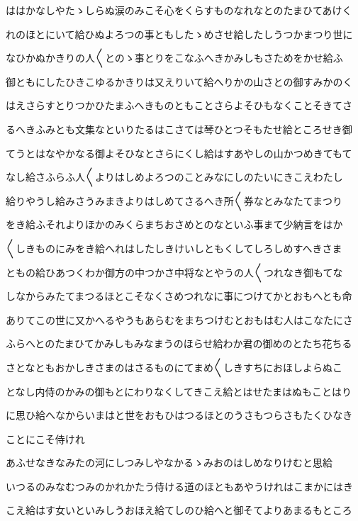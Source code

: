 \documentclass[a4paper,11pt,landscape]{ltjtarticle}
\begin{document}
\par\medskip
ははかなしやたゝしらぬ涙のみこそ心をくらすものなれなとのたまひてあけく
\par\medskip
れのほとにいて給ひぬよろつの事ともしたゝめさせ給したしうつかまつり世に
\par\medskip
なひかぬかきりの人〱とのゝ事とりをこなふへきかみしもさためをかせ給ふ
\par\medskip
御ともにしたひきこゆるかきりは又えりいて給へりかの山さとの御すみかのく
\par\medskip
はえさらすとりつかひたまふへきものともことさらよそひもなくことそきてさ
\par\medskip
るへきふみとも文集なといりたるはこさては琴ひとつそもたせ給ところせき御
\par\medskip
てうとはなやかなる御よそひなとさらにくし給はすあやしの山かつめきてもて
\par\medskip
なし給さふらふ人〱よりはしめよろつのことみなにしのたいにきこえわたし
\par\medskip
給りやうし給みさうみまきよりはしめてさるへき所〱券なとみなたてまつり
\par\medskip
をき給ふそれよりほかのみくらまちおさめとのなといふ事まて少納言をはか
\par\medskip
〱しきものにみをき給へれはしたしきけいしともくしてしろしめすへきさま
\par\medskip
ともの給ひあつくわか御方の中つかさ中将なとやうの人〱つれなき御もてな
\par\medskip
しなからみたてまつるほとこそなくさめつれなに事につけてかとおもへとも命
\par\medskip
ありてこの世に又かへるやうもあらむをまちつけむとおもはむ人はこなたにさ
\par\medskip
ふらへとのたまひてかみしもみなまうのほらせ給わか君の御めのとたち花ちる
\par\medskip
さとなともおかしきさまのはさるものにてまめ〱しきすちにおほしよらぬこ
\par\medskip
となし内侍のかみの御もとにわりなくしてきこえ給とはせたまはぬもことはり
\par\medskip
に思ひ給へなからいまはと世をおもひはつるほとのうさもつらさもたくひなき
\par\medskip
ことにこそ侍けれ
\par\medskip
あふせなきなみたの河にしつみしやなかるゝみおのはしめなりけむと思給
\par\medskip
いつるのみなむつみのかれかたう侍ける道のほともあやうけれはこまかにはき
\par\medskip
こえ給はす女いといみしうおほえ給てしのひ給へと御そてよりあまるもところ
\end{document}
